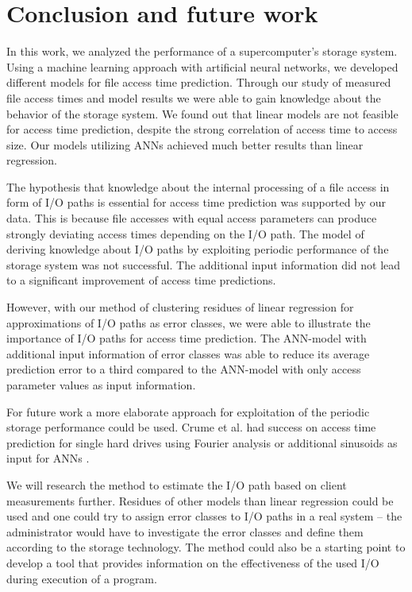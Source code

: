 \documentclass{superfri}
\begin{document}
	\section{Conclusion and future work}
	\label{conclusion}
	In this work, we analyzed the performance of a supercomputer's storage system.
	Using a machine learning approach with artificial neural networks, we developed different models for file access time prediction.
	Through our study of measured file access times and model results we were able to gain knowledge about the behavior of the storage system.
	We found out that linear models are not feasible for access time prediction, despite the strong correlation of access time to access size.
	Our models utilizing ANNs achieved much better results than linear regression.
	
	The hypothesis that knowledge about the internal processing of a file access in form of I/O paths is essential for access time prediction was supported by our data.
	This is because file accesses with equal access parameters can produce strongly deviating access times depending on the I/O path. 
	The model of deriving knowledge about I/O paths by exploiting periodic performance of the storage system was not successful.
	The additional input information did not lead to a significant improvement of access time predictions.
	
	However, with our method of clustering residues of linear regression for approximations of I/O paths as error classes, we were able to illustrate the importance of I/O paths for access time prediction. The ANN-model with additional input information of error classes was able to reduce its average prediction error to a third compared to the ANN-model with only access parameter values as input information.\medskip
	
	For future work a more elaborate approach for exploitation of the periodic storage performance could be used. 
	Crume et al. had success on access time prediction for single hard drives using Fourier analysis \cite{Crume:2013:FML:2538542.2538561} or additional sinusoids as input for ANNs \cite{crumelatent}.
	
	We will research the method to estimate the I/O path based on client measurements further.
	Residues of other models than linear regression could be used and one could try to assign error classes to I/O paths in a real system -- the administrator would have to investigate the error classes and define them according to the storage technology.
	The method could also be a starting point to develop a tool that provides information on the effectiveness of the used I/O during execution of a program.
	
	\openaccess
	
	
	
\end{document}
